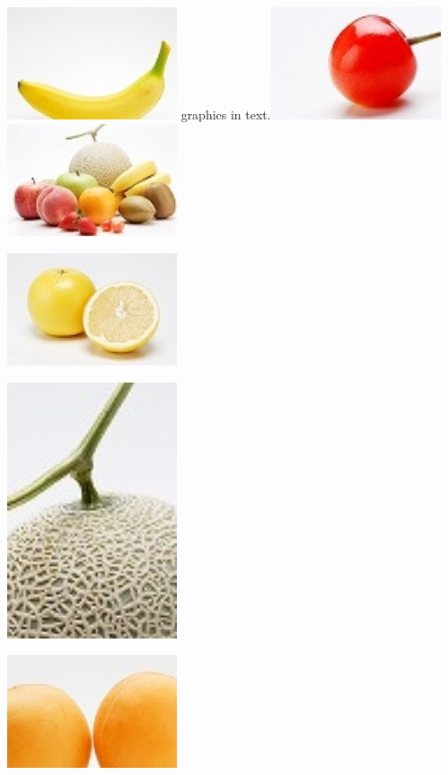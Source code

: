 \documentclass{jsarticle}
\begin{document}
\includegraphics[width=5cm]{banana.jpg} graphics in text.\includegraphics[width=5cm]{cherry.jpg} \includegraphics[width=5cm]{fruits.jpg}

\includegraphics[width=5cm]{grapefruits.jpg}

\includegraphics[width=5cm]{melon.jpg}

\includegraphics[width=5cm]{orange.jpg}
\end{document}
